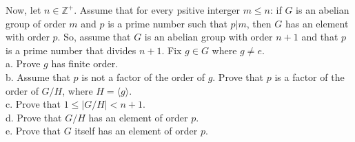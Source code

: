 Now, let $n\in\mathbb{Z}^+$. Assume that for every psitive interger $m\leq n$: if $G$ is an abelian
group of order $m$ and $p$ is a prime number such that $p|m$, then $G$ has an element with order $p$.
So, assume that $G$ is an abelian group with order $n+1$ and that $p$ is a prime number that divides
$n+1$. Fix $g\in G$ where $g\neq e$.\\

a. Prove $g$ has finite order.\\

b. Assume that $p$ is not a factor of the order of $g$. Prove that $p$ is a factor of the order of
$G/H$, where $H=\langle g\rangle$.\\

c. Prove that $1\leq|G/H|<n+1$.\\

d. Prove that $G/H$ has an element of order $p$.\\

e. Prove that $G$ itself has an element of order $p$.\\\\

